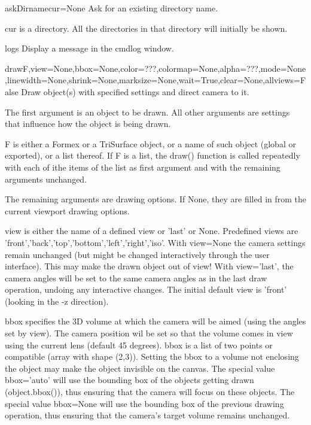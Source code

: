 \begin{funcdesc}{askDirname}{cur=None}
Ask for an existing directory name.

    cur is a directory. All the directories in that directory will
    initially be shown.
    

\end{funcdesc}


\begin{funcdesc}{log}{s}
Display a message in the cmdlog window.

\end{funcdesc}


\begin{funcdesc}{draw}{F,view=None,bbox=None,color=???,colormap=None,alpha=???,mode=None,linewidth=None,shrink=None,marksize=None,wait=True,clear=None,allviews=False}
Draw object(s) with specified settings and direct camera to it.

    The first argument is an object to be drawn. All other arguments are
    settings that influence how  the object is being drawn.

    F is either a Formex or a TriSurface object, or a name of such object
    (global or exported), or a list thereof.
    If F is a list, the draw() function is called repeatedly with each of
    ithe items of the list as first argument and with the remaining arguments
    unchanged.

    The remaining arguments are drawing options. If None, they are filled in
    from the current viewport drawing options.
    
    view is either the name of a defined view or 'last' or None.
    Predefined views are 'front','back','top','bottom','left','right','iso'.
    With view=None the camera settings remain unchanged (but might be changed
    interactively through the user interface). This may make the drawn object
    out of view!
    With view='last', the camera angles will be set to the same camera angles
    as in the last draw operation, undoing any interactive changes.
    The initial default view is 'front' (looking in the -z direction).

    bbox specifies the 3D volume at which the camera will be aimed (using the
    angles set by view). The camera position wil be set so that the volume
    comes in view using the current lens (default 45 degrees).
    bbox is a list of two points or compatible (array with shape (2,3)).
    Setting the bbox to a volume not enclosing the object may make the object
    invisible on the canvas.
    The special value bbox='auto' will use the bounding box of the objects
    getting drawn (object.bbox()), thus ensuring that the camera will focus
    on these objects.
    The special value bbox=None will use the bounding box of the previous
    drawing operation, thus ensuring that the camera's target volume remains
    unchanged.


\end{funcdesc}
